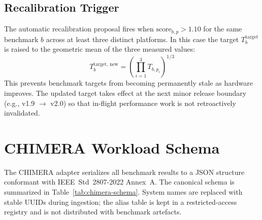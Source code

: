 \documentclass[conference]{IEEEtran}
\begin{document}
\subsection{Recalibration Trigger}

The automatic recalibration proposal fires when
$\text{score}_{b,p} > 1.10$ for the same benchmark $b$ across
at least three distinct platforms.
In this case the target $T_b^{\text{target}}$ is raised to the
geometric mean of the three measured values:
\begin{equation}
  T_b^{\text{target, new}} =
    \left(\prod_{i=1}^{3} T_{b,p_i}\right)^{1/3}
  \label{eq:recalib}
\end{equation}
This prevents benchmark targets from becoming permanently stale as
hardware improves.
The updated target takes effect at the next minor release boundary
(e.g., v1.9 $\to$ v2.0) so that in-flight performance work is not
retroactively invalidated.

\section{CHIMERA Workload Schema}
\label{app:chimera}

The CHIMERA adapter serializes all benchmark results to a JSON
structure conformant with IEEE~Std~2807-2022 Annex~A.
The canonical schema is summarized in Table~\ref{tab:chimera-schema}.
System names are replaced with stable UUIDs during ingestion; the
alias table is kept in a restricted-access registry and is not
distributed with benchmark artefacts.
\end{document}

